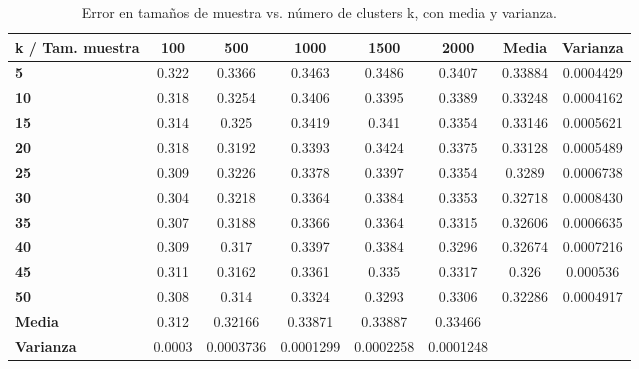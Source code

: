\begin{table}[h!]
	\scriptsize
	\caption{Error en tamaños de muestra vs. número de clusters k, con media y varianza.}
	\begin{tabularx}{\textwidth}{Xccccccc}
		\toprule
		\textbf{k / Tam. muestra} &
		\textbf{100} &
		\textbf{500} &
		\textbf{1000} &
		\textbf{1500} &
		\textbf{2000} &
		\textbf{Media} &
		\textbf{Varianza} \\ \midrule
		\textbf{5}  & 0.322 & 0.3366 & 0.3463 & 0.3486 & 0.3407 & 0.33884                         & 0.0004429                         \\
		\textbf{10} & 0.318 & 0.3254 & 0.3406 & 0.3395 & 0.3389 & 0.33248                         & \cellcolor[HTML]{D9EAD3}0.0004162 \\
		\textbf{15} & 0.314 & 0.325  & 0.3419 & 0.341  & 0.3354 & 0.33146                         & 0.0005621                       \\
		\textbf{20} & 0.318 & 0.3192 & 0.3393 & 0.3424 & 0.3375 & 0.33128                         & 0.0005489                        \\
		\textbf{25} & 0.309 & 0.3226 & 0.3378 & 0.3397 & 0.3354 & 0.3289                          & 0.0006738                           \\
		\textbf{30} & 0.304 & 0.3218 & 0.3364 & 0.3384 & 0.3353 & 0.32718                         & 0.0008430                        \\
		\textbf{35} & 0.307 & 0.3188 & 0.3366 & 0.3364 & 0.3315 & 0.32606                         & 0.0006635                       \\
		\textbf{40} & 0.309 & 0.317  & 0.3397 & 0.3384 & 0.3296 & 0.32674                         & 0.0007216                      \\
		\textbf{45} & 0.311 & 0.3162 & 0.3361 & 0.335  & 0.3317 & 0.326                           & 0.000536                      \\
		\textbf{50} & 0.308 & 0.314  & 0.3324 & 0.3293 & 0.3306 & \cellcolor[HTML]{D9EAD3}0.32286 & 0.0004917                         \\
		\midrule
		\textbf{Media} &
		\cellcolor[HTML]{D9EAD3}0.312 &
		0.32166 &
		0.33871 &
		0.33887 &
		0.33466 &
		 \\
		\textbf{Varianza} &
		0.0003 &
		0.0003736 &
		0.0001299 &
		0.0002258 &
		\cellcolor[HTML]{D9EAD3}0.0001248 &
		  \\
		\bottomrule
	\end{tabularx}
	\label{tab:analisis-error-vs-k}
\end{table}

